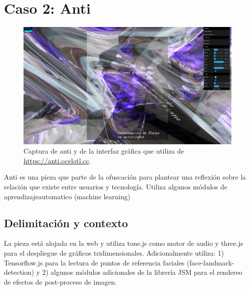 \chapter{Caso 2: Anti}



\begin{figure}[tb]
\centering 
\includegraphics[width=\columnwidth]{img/anti01.png} 
\caption[Captura de Anti]{Captura de anti y de la interfaz gráfica que utiliza de \url{https://anti.ocelotl.cc}.} %
\label{fig:gallery} 
\end{figure}

Anti es una pieza que parte de la ofuscación para plantear una reflexión sobre la relación que existe entre usuarios y tecnología. Utiliza algunos módulos de \gls{aprendizajeautomatico} (machine learning) 


\section{Delimitación y contexto}

La pieza está alojada en la web y utiliza tone.js como motor de audio y three.js para el despliegue de gráficos tridimensionales. Adicionalmente utiliza: 1) Tensorflow.js para la lectura de puntos de referencia faciales (face-landmark-detection) y 2) algunos módulos adicionales de la librería JSM para el rendereo de efectos de post-proceso de imagen.

